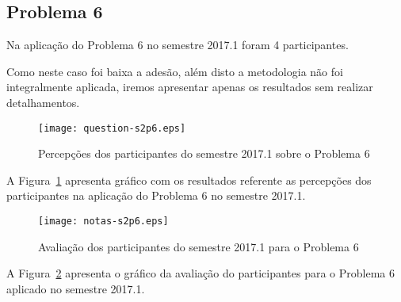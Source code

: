 \subsection{Problema 6}
Na aplicação do Problema 6 no semestre 2017.1 foram 4 participantes.

Como neste caso foi baixa a adesão, além disto a metodologia
não foi integralmente aplicada, iremos apresentar apenas
os resultados sem realizar detalhamentos.

\begin{figure}[!htb]
\centering
\texttt{[image: question-s2p6.eps]}
\caption{Percepções dos participantes do semestre 2017.1 sobre o Problema 6}
\label{percep-s2p6}
\end{figure}

A Figura~\ref{percep-s2p6} apresenta gráfico com os resultados referente
as percepções dos participantes na aplicação do
Problema 6 no semestre 2017.1.

\begin{figure}[!htb]
\centering
\texttt{[image: notas-s2p6.eps]}
\caption{Avaliação dos participantes do semestre 2017.1 para o Problema 6}
\label{aval-s2p6}
\end{figure}

A Figura~\ref{aval-s2p6} apresenta o gráfico da
avaliação do participantes para o Problema 6 aplicado no semestre 2017.1.

